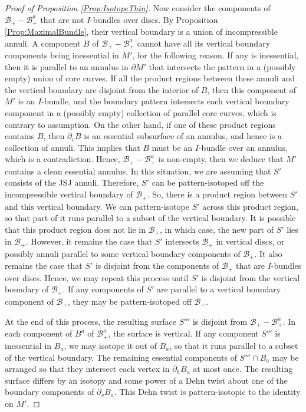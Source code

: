 \documentclass[oneside]{amsart}
\numberwithin{equation}{section}
\theoremstyle{plain}
\theoremstyle{definition}
\newcommand{\calB}{\mathcal{B}}
\begin{document}
\begin{proof}[Proof of Proposition \ref{Prop:IsotopeThin}]
Now consider the components of $\calB_+ - \calB^a_+$ that are not $I$-bundles over discs. By Proposition \ref{Prop:MaximalBundle}, their vertical
boundary is a union of incompressible annuli. A component $B$ of $\calB_+ - \calB^a_+$ cannot have all its vertical boundary
components being inessential in $M'$, for the following reason. If any is inessential, then it is parallel to an annulus in $\partial M'$ that intersects
the pattern in a (possibly empty) union of core curves. If all the product regions between these annuli
and the vertical boundary are disjoint from the interior of $B$, then this component of $M'$
is an $I$-bundle, and the boundary pattern intersects each vertical boundary component in a (possibly empty) collection
of parallel core curves, which is contrary to assumption. On the other hand, if one of these product regions
contains $B$, then $\partial_vB$ is an essential subsurface of an annulus, and hence is a collection of annuli.
This implies that $B$ must be an $I$-bundle over an annulus, which is a contradiction. Hence,
 $\calB_+ - \calB^a_+$ is non-empty, then we deduce
that $M'$ contains a clean essential annulus. In this situation, we are assuming that $S'$ consists
of the JSJ annuli. Therefore, $S'$ can be pattern-isotoped off the incompressible vertical boundary of $\calB_+$. So,
there is a product region between $S'$ and this vertical boundary. We can pattern-isotope $S'$ across this product region,
so that part of it runs parallel to a subset of the vertical boundary. It is possible that this product region does
not lie in $\calB_+$, in which case, the new part of $S'$ lies in $\calB_+$. However, it remains the case that
$S'$ intersects $\calB_+$ in vertical discs, or possibly annuli parallel to some vertical boundary components of $\calB_+$.
It also remains the case that $S'$ is disjoint from the components of $\calB_+$ that are $I$-bundles over discs.
Hence, we may repeat this process until $S'$ is disjoint from the vertical boundary of $\calB_+$. If any
components of $S'$ are parallel to a vertical boundary component of $\calB_+$, they may be pattern-isotoped
off $\calB_+$.

At the end of this process, the resulting surface $S'''$ is disjoint from $\calB_+ - \calB_+^a$. In each component
of $B^a$ of $\calB_+^a$, the surface is vertical. If any component $S'''$ is inessential in $B_a$, we may isotope
it out of $B_a$, so that it runs parallel to a subset of the vertical boundary. The remaining essential components
of $S''' \cap B_a$ may be arranged so that they intersect each vertex in $\partial_h B_a$ at most once.
The resulting surface differs by an isotopy and some power of a Dehn twist about one of the boundary components
of $\partial_v B_a$. This Dehn twist is pattern-isotopic to the identity on $M'$.


\end{proof}
\end{document}
